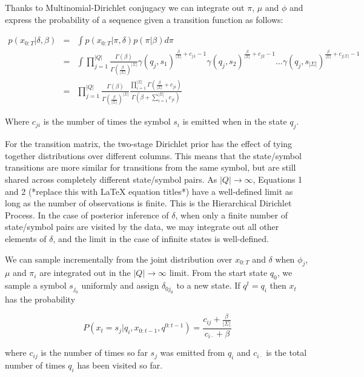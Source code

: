 Thanks to Multinomial-Dirichlet conjugacy we can integrate out $\pi$, $\mu$ and $\phi$ and express the probability of a sequence given a transition function as follows:

\begin{eqnarray}
 p(x_{0:T}|\delta,\beta) & = & \int p(x_{0:T}|\pi,\delta) p(\pi|\beta) d\pi \\
 & = &  \int \prod_{j=1}^{|Q|} \frac{\Gamma(\beta)}{\Gamma(\frac{\beta}{|\Sigma|})^{|\Sigma|}} \gamma(q_j,s_1)^{\frac{\beta}{|\Sigma|}+c_{j1}-1} \gamma(q_j,s_2)^{\frac{\beta}{|\Sigma|}+c_{j2}-1} \ldots \gamma(q_j,s_{|\Sigma|})^{\frac{\beta}{|\Sigma|}+c_{j|\Sigma|}-1} \\
 & = & \prod_{j=1}^{|Q|} \frac{\Gamma(\beta)}{\Gamma(\frac{\beta}{|\Sigma|})^{|\Sigma|}} \frac{\prod_{i=1}^{|\Sigma|}\Gamma(\frac{\beta}{|\Sigma|} + c_{ji})}{\Gamma(\beta + \sum_{i=1}^{|\Sigma|} c_{ji})}
 \end{eqnarray}
 
 Where $c_{ji}$ is the number of times the symbol $s_i$ is emitted when in the state $q_j$.  
 
 For the transition matrix, the two-stage Dirichlet prior has the effect of tying together distributions over different columns.  This means that the state/symbol transitions are more similar for transitions from the same symbol, but are still shared across completely different state/symbol pairs.  As $|Q|\rightarrow\infty$, Equations 1 and 2 (*replace this with LaTeX equation titles*) have a well-defined limit as long as the number of observations is finite.  This is the Hierarchical Dirichlet Process.  In the case of posterior inference of $\delta$, when only a finite number of state/symbol pairs are visited by the data, we may integrate out all other elements of $\delta$, and the limit in the case of infinite states is well-defined.
 
We can sample incrementally from the joint distribution over $x_{0:T}$ and $\delta$ when $\phi_j$, $\mu$ and $\pi_i$ are integrated out in the $|Q|\rightarrow\infty$ limit.  From the start state $q_0$, we sample a symbol $s_{j_0}$ uniformly and assign $\delta_{0j_0}$ to a new state.  If $q^t = q_i$ then $x_t$ has the probability

 \[P(x_t=s_j|q_i,x_{0:t-1},q^{0:t-1}) = \frac{c_{ij}+\frac{\beta}{|\Sigma|}}{c_{i\cdot} + \beta}\]
 
 where $c_{ij}$ is the number of times so far $s_j$ was emitted from $q_i$ and $c_{i\cdot}$ is the total number of times $q_i$ has been visited so far.  
 
